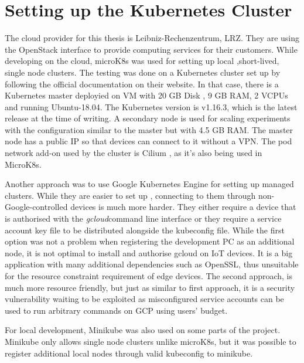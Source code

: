 \section{Setting up the Kubernetes Cluster}
The cloud provider for this thesis is Leibniz-Rechenzentrum, LRZ. They are using the OpenStack \cite{openstack} interface to provide computing services for their customers. While developing on the cloud, microK8s was used for setting up local ,short-lived, single node clusters. The testing was done on a Kubernetes cluster set up by following the official documentation on their website. In that case, there is a Kubernetes master deployied on VM with 20 GB Disk , 9 GB RAM, 2 VCPUs and running Ubuntu-18.04. The Kubernetes version is v1.16.3, which is the latest release at the time of writing. A secondary node is used for scaling experiments with the configuration similar to the master but with 4.5 GB RAM. The master node has a public IP so that devices can connect to it without a VPN. The pod network add-on used by the cluster is Cilium \cite{cilium}, as it's also being used in MicroK8s.

Another approach was to use Google Kubernetes Engine for setting up managed clusters. While they are easier to set up , connecting to them through non-Google-controlled devices is much more harder. They either require a device that is authorised with the \textit{gcloud}command line interface or they require a service account key file to be distributed alongside the kubeconfig file. While the first option was not a problem when registering the development PC as an additional node, it is not optimal to install and authorise gcloud on IoT devices. It is a big application with many additional dependencies such as OpenSSL, thus unsuitable for the resource constraint requirement of edge devices. The second approach, is much more resource friendly, but just as similar to first approach, it is a security vulnerability waiting to be exploited as misconfigured service accounts can be used to run arbitrary commands on GCP using users' budget.

For local development, Minikube was also used on some parts of the project. Minikube only allows single node clusters unlike microK8s, but it was possible to register additional local nodes through valid kubeconfig to minikube.
